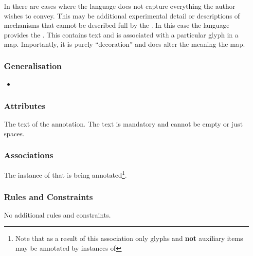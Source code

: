 In \SBGNPDLone there are cases where the language does not capture
everything the author wishes to convey. This may be additional
experimental detail or descriptions of mechanisms that cannot be
described full by the \PDl. In this case the language provides the
. This contains text and is associated with a
particular glyph in a map. Importantly, it is purely ``decoration''
and does alter the meaning the map.


\subsubsection{Generalisation}

\begin{itemize}
\item {}
\end{itemize}

\subsubsection{Attributes}

\begin{attributes}
   The text of the
  annotation. The text is mandatory and cannot be empty or just
  spaces.
\end{attributes}

\subsubsection{Associations}

\begin{attributes}
   The instance
  of  that is being annotated\footnote{Note that
    as a result of this association only glyphs and \textbf{not}
    auxiliary items may be annotated by instances of
    }.
\end{attributes}

\subsubsection{Rules and Constraints}

No additional rules and constraints.


